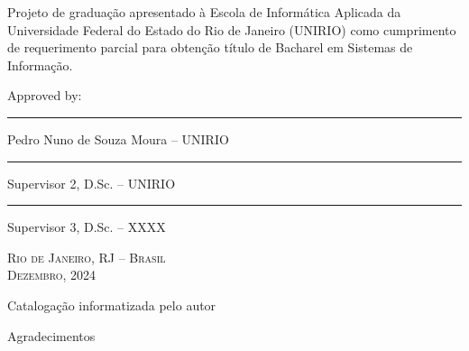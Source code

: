 \documentclass[a4paper, 12pt]{article}
\begin{document}
    \begin{flushright}
        \parbox{8.0cm}{
        Projeto de graduação apresentado à Escola de Informática Aplicada
        da Universidade Federal do Estado do Rio de Janeiro (UNIRIO) como
        cumprimento de requerimento parcial para obtenção título de Bacharel em
        Sistemas de Informação.}
        \vskip 1.5cm
        Approved by:
        \vskip 1.5cm
        \rule{10.0cm}{.1mm}

        Pedro Nuno de Souza Moura -- UNIRIO
        \vskip 1.0cm
        
        \rule{10.0cm}{.1mm}

        Supervisor 2, D.Sc. -- UNIRIO
        \vskip 1.0cm

        \rule{10.0cm}{.1mm}

        Supervisor 3, D.Sc. -- XXXX
        \vskip 1.0cm
    \end{flushright}
    \begin{center}
        \textsc{Rio de Janeiro, RJ -- Brasil} \\ \textsc{Dezembro, 2024}
    \end{center}
    \clearpage

    \vfill
    
    \begin{center}
        Catalogação informatizada pelo autor
    \end{center}

    \clearpage

    \begin{flushright}
        Agradecimentos
    \end{flushright}
    \lipsum[1-2]

    \clearpage
\end{document}
